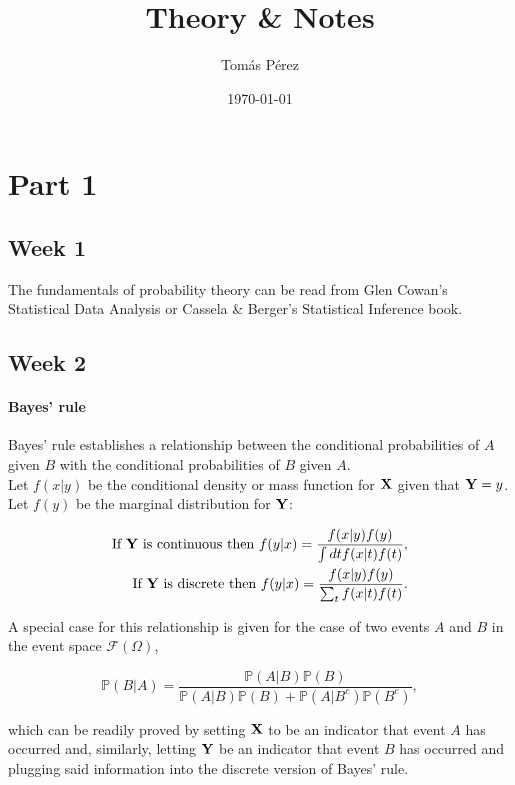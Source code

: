 \documentclass{homework}
\author{Tomás Pérez}
\date{\today}
\title{Theory \& Notes}
\begin{document}
 \maketitle

\section{Part 1}

\subsection{Week 1}

The fundamentals of probability theory can be read from Glen Cowan's Statistical Data Analysis or Cassela & Berger's Statistical Inference book. 

\subsection{Week 2}

\paragraph{Bayes' rule}

Bayes' rule establishes a relationship between the conditional probabilities of $A$ given $B$ with the conditional probabilities of $B$ given $A$.\\

Let $f(x | y)$ be the conditional density or mass function for ${\bf X}$ given that ${\bf Y}=y$. Let $f(y)$ be the marginal distribution for ${\bf Y}$:

\begin{align*}
\textnormal{If } {\bf Y} \textnormal{ is continuous then }
f(y|x) = \frac{f(x|y)f(y)}{\int dt f(x|t)f(t)}, \\
\textnormal{If } {\bf Y} \textnormal{ is discrete then }
f(y|x) = \frac{f(x|y)f(y)}{\sum_{t} f(x|t)f(t)}.
\end{align*}

A special case for this relationship is given for the case of two events $A$ and $B$ in the event space $\mathcal{F}(\Omega)$, 

$$
\mathds{P}(B|A)= \frac{\mathds{P}(A|B)\mathds{P}(B)}{\mathds{P}(A|B)\mathds{P}(B)+\mathds{P}(A|B^c)\mathds{P}(B^c)},
$$

which can be readily proved by setting ${\bf X}$ to be an indicator that event $A$ has occurred and, similarly, letting ${\bf Y}$ be an indicator that event $B$ has occurred and plugging said information into the discrete version of Bayes' rule. \\
\end{document}
